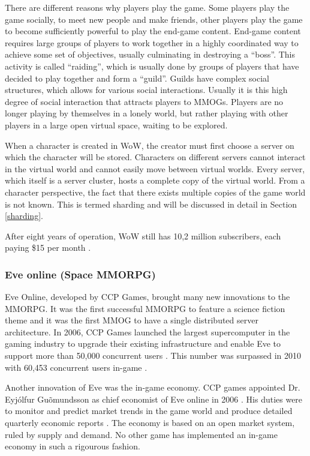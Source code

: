 There are different reasons why players play the game. Some players play the game socially, to meet new people and make friends, other players play the game to become sufficiently powerful to play the end-game content. End-game content requires large groups of players to work together in a highly coordinated way to achieve some set of objectives, usually culminating in destroying a ``boss''. This activity is called ``raiding'', which is usually done by groups of players that have decided to play together and form a ``guild''. Guilds have complex social structures, which allows for various social interactions. Usually it is this high degree of social interaction that attracts players to MMOGs. Players are no longer playing by themselves in a lonely world, but rather playing with other players in a large open virtual space, waiting to be explored.

When a character is created in WoW, the creator must first choose a server on which the character will be stored. Characters on different servers cannot interact in the virtual world and cannot easily move between virtual worlds. Every server, which itself is a server cluster, hosts a complete copy of the virtual world. From a character perspective, the fact that there exists multiple copies of the game world is not known. This is termed sharding and will be discussed in detail in Section \ref{sharding}.

After eight years of operation, WoW still has 10,2 million subscribers, each paying \$15 per month \cite{wow_firstq_fin_results_2012}.

\subsubsection{Eve online (Space MMORPG)}

Eve Online, developed by CCP Games, brought many new innovations to the MMORPG. It was the first successful MMORPG to feature a science fiction theme and it was the first MMOG to have a single distributed server architecture. In 2006, CCP Games launched the largest supercomputer in the gaming industry to upgrade their existing infrastructure and enable Eve to support more than 50,000 concurrent users \cite{eve_launces_supcom}. This number was surpassed in 2010 with 60,453 concurrent users in-game \cite{eve_pcu}.

Another innovation of Eve was the in-game economy. CCP games appointed Dr. Eyj\'{o}lfur Gu\~{o}mundsson as chief economist of Eve online in 2006 \cite{eve_economist}. His duties were to monitor and predict market trends in the game world and produce detailed quarterly economic reports \cite{eve_econ_rep}.  The economy is based on an open market system, ruled by supply and demand. No other game has implemented an in-game economy in such a rigourous fashion.

